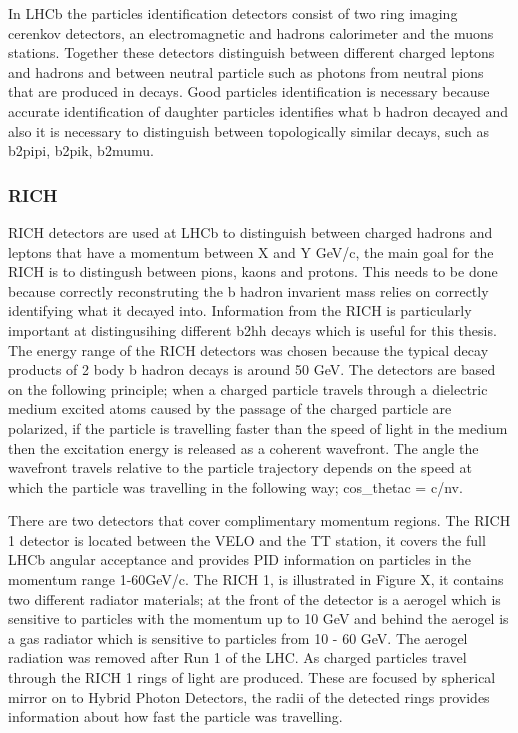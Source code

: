 In LHCb the particles identification detectors consist of two ring imaging cerenkov detectors, an electromagnetic and hadrons calorimeter and the muons stations. Together these detectors distinguish between different charged leptons and hadrons and between neutral particle such as photons from neutral pions that are produced in \bhadron decays. Good particles identification is necessary because accurate identification of daughter particles identifies what b hadron decayed and also it is necessary to distinguish between topologically similar decays, such as b2pipi, b2pik, b2mumu. %
\subsubsection{RICH}
\label{RICH}
RICH detectors are used at LHCb to distinguish between charged hadrons and leptons that have a momentum between X and Y GeV/c, the main goal for the RICH is to distingush between pions, kaons and protons. This needs to be done because correctly reconstruting the b hadron invarient mass relies on correctly identifying what it decayed into. Information from the RICH is particularly important at distingusihing different b2hh decays which is useful for this thesis. The energy range of the RICH detectors was chosen because the typical decay products of 2 body b hadron decays is around 50 GeV. The detectors are based on the following principle; when a charged particle travels through a dielectric medium excited atoms caused by the passage of the charged particle are polarized, if the particle is travelling faster than the speed of light in the medium then the excitation energy is released as a coherent wavefront. The angle the wavefront travels relative to the particle trajectory depends on the speed at which the particle was travelling in the following way;
cos_thetac = c/nv. 

There are two detectors that cover complimentary momentum regions. The RICH 1 detector is located between the VELO and the TT station, it covers the full LHCb angular acceptance and provides PID information on particles in the momentum range 1-60GeV/c. The RICH 1, is illustrated in Figure X, it contains two different radiator materials; at the front of the detector is a aerogel which is sensitive to particles with the momentum up to 10 GeV and behind the aerogel is a gas radiator which is sensitive to particles from 10 - 60 GeV. The aerogel radiation was removed after Run 1 of the LHC. As charged particles travel through the RICH 1 rings of light are produced. These are focused by spherical mirror on to Hybrid Photon Detectors, the radii of the detected rings provides information about how fast the particle was travelling. %

